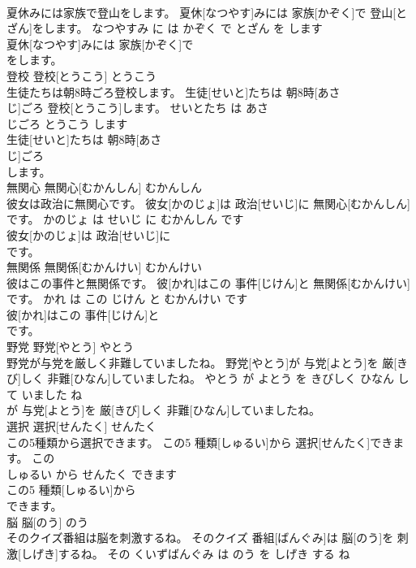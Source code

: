 \documentclass[8pt]{extreport}
\begin{document}
\begin{CJK}{UTF8}{min}
\\	夏休みには家族で登山をします。	夏休[なつやす]みには 家族[かぞく]で 登山[とざん]をします。	なつやすみ に は かぞく で とざん を します	
\\	夏休[なつやす]みには 家族[かぞく]で
\\	をします。			
\\	登校	登校[とうこう]	とうこう	
\\	生徒たちは朝8時ごろ登校します。	生徒[せいと]たちは 朝8時[あさ 
\\	じ]ごろ 登校[とうこう]します。	せいとたち は あさ 
\\	じごろ とうこう します	
\\	生徒[せいと]たちは 朝8時[あさ 
\\	じ]ごろ
\\	します。			
\\	無関心	無関心[むかんしん]	むかんしん	
\\	彼女は政治に無関心です。	彼女[かのじょ]は 政治[せいじ]に 無関心[むかんしん]です。	かのじょ は せいじ に むかんしん です	
\\	彼女[かのじょ]は 政治[せいじ]に
\\	です。			
\\	無関係	無関係[むかんけい]	むかんけい	
\\	彼はこの事件と無関係です。	彼[かれ]はこの 事件[じけん]と 無関係[むかんけい]です。	かれ は この じけん と むかんけい です	
\\	彼[かれ]はこの 事件[じけん]と
\\	です。			
\\	野党	野党[やとう]	やとう	
\\	野党が与党を厳しく非難していましたね。	野党[やとう]が 与党[よとう]を 厳[きび]しく 非難[ひなん]していましたね。	やとう が よとう を きびしく ひなん して いました ね	
\\	が 与党[よとう]を 厳[きび]しく 非難[ひなん]していましたね。			
\\	選択	選択[せんたく]	せんたく	
\\	この5種類から選択できます。	この5 種類[しゅるい]から 選択[せんたく]できます。	この 
\\	しゅるい から せんたく できます	
\\	この5 種類[しゅるい]から
\\	できます。			
\\	脳	脳[のう]	のう	
\\	そのクイズ番組は脳を刺激するね。	そのクイズ 番組[ばんぐみ]は 脳[のう]を 刺激[しげき]するね。	その くいずばんぐみ は のう を しげき する ね	

\end{CJK}
\end{document}
